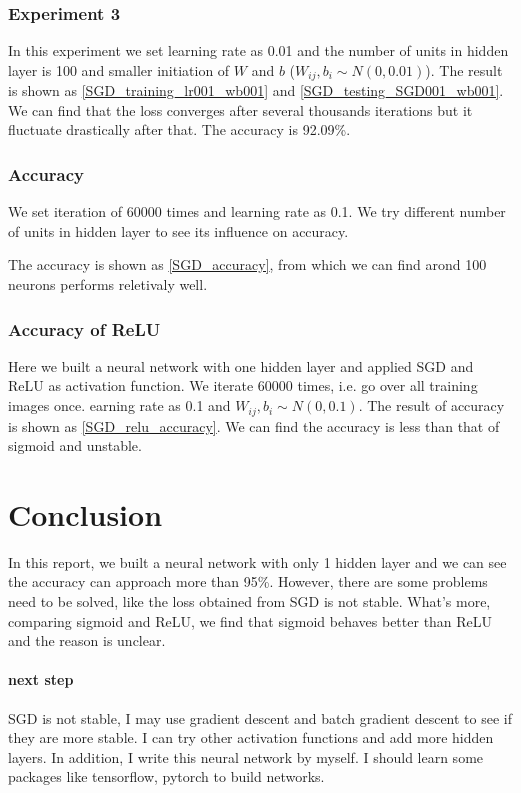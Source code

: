 \documentclass[11pt]{scrartcl} %
\begin{document}
\subsubsection{Experiment 3}

In this experiment we set learning rate as 0.01 and the number of units in hidden layer is 100 and smaller initiation of $W$ and $b$ ($W_{ij}, b_i \sim N(0,0.01)$). The result is shown as \ref{SGD_training_lr001_wb001} and \ref{SGD_testing_SGD001_wb001}. We can find that the loss converges after several thousands iterations but it fluctuate drastically after that. The accuracy is 92.09\%.



\subsubsection{Accuracy}

We set iteration of 60000 times and learning rate as 0.1. We try different number of units in hidden layer to see its influence on accuracy.

The accuracy is shown as \ref{SGD_accuracy}, from which we can find arond 100 neurons performs reletivaly well.


\subsubsection{Accuracy of ReLU}
Here we built a neural network with one hidden layer and applied SGD and ReLU as activation function. We iterate 60000 times, i.e. go over all training images once. earning rate as 0.1 and $W_{ij}, b_i \sim N(0,0.1)$. The result of accuracy is shown as \ref{SGD_relu_accuracy}. We can find the accuracy is less than that of sigmoid and unstable.




\section{Conclusion}

In this report, we built a neural network with only 1 hidden layer and we can see the accuracy can approach more than 95\%. However, there are some problems need to be solved, like the loss obtained from SGD is not stable. What's more, comparing sigmoid and ReLU, we find that sigmoid behaves better than ReLU and the reason is unclear.

\paragraph{next step}
SGD is not stable, I may use gradient descent and batch gradient descent to see if they are more stable. I can try other activation functions and add more hidden layers. In addition, I write this neural network by myself. I should learn some packages like tensorflow, pytorch to build networks.


\end{document}
